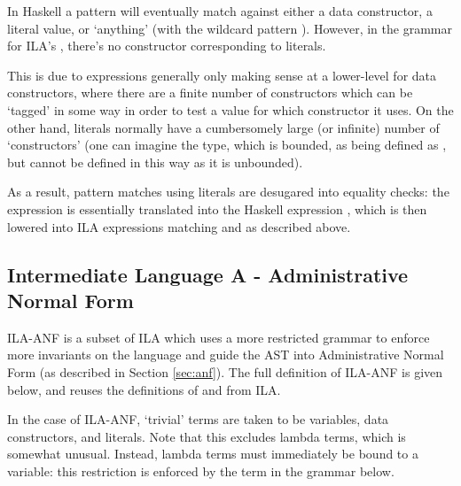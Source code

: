\documentclass[dissertation.tex]{subfiles}
\begin{document}
{{{            In Haskell a pattern will eventually match against either a data constructor, a literal value, or
            `anything' (with the wildcard pattern \haskell{_}). However, in the grammar for ILA's
            , there's no constructor corresponding to literals.
            
            This is due to  expressions generally only making sense at a lower-level for data
            constructors, where there are a finite number of constructors which can be `tagged' in some way in order
            to test a value for which constructor it uses. On the other hand, literals normally have a cumbersomely
            large (or infinite) number of `constructors' (one can imagine the  type, which is bounded,
            as being defined as , but  cannot be
            defined in this way as it is unbounded).
            
            As a result, pattern matches using literals are desugared into equality checks: the expression
             is essentially translated into the Haskell expression
            , which is then lowered into ILA 
            expressions matching  and  as described above.

        }
    }
    \subsection{Intermediate Language A - Administrative Normal Form}
    {

        ILA-ANF is a subset of ILA which uses a more restricted grammar to enforce more invariants on the language
        and guide the AST into Administrative Normal Form (as described in Section \ref{sec:anf}). The full definition of ILA-ANF is given below, and reuses the definitions of
         and  from ILA.

        In the case of ILA-ANF, `trivial' terms are taken to be variables, data constructors, and literals. Note
        that this excludes lambda terms, which is somewhat unusual. Instead, lambda terms must immediately be bound
        to a variable: this restriction is enforced by the  term in the grammar below.


}}
\end{document}
